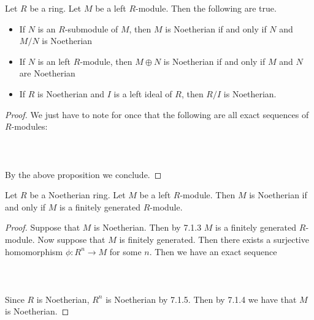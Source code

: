 \documentclass[a4paper]{article}
\begin{document}
\begin{crl}{}{} Let $R$ be a ring. Let $M$ be a left $R$-module. Then the following are true. 
\begin{itemize}
\item If $N$ is an $R$-submodule of $M$, then $M$ is Noetherian if and only if $N$ and $M/N$ is Noetherian
\item If $N$ is an left $R$-module, then $M\oplus N$ is Noetherian if and only if $M$ and $N$ are Noetherian
\item If $R$ is Noetherian and $I$ is a left ideal of $R$, then $R/I$ is Noetherian. 
\end{itemize} 
\begin{proof}
We just have to note for once that the following are all exact sequences of $R$-modules: \\~\\
\\~\\
By the above proposition we conclude. 
\end{proof}
\end{crl}

\begin{crl}{}{} Let $R$ be a Noetherian ring. Let $M$ be a left $R$-module. Then $M$ is Noetherian if and only if $M$ is a finitely generated $R$-module. 
\begin{proof}
Suppose that $M$ is Noetherian. Then by 7.1.3 $M$ is a finitely generated $R$-module. Now suppose that $M$ is finitely generated. Then there exists a surjective homomorphism $\phi:R^n\to M$ for some $n$. Then we have an exact sequence \\~\\
\\~\\
Since $R$ is Noetherian, $R^n$ is Noetherian by 7.1.5. Then by 7.1.4 we have that $M$ is Noetherian. 
\end{proof}
\end{crl}
\end{document}
